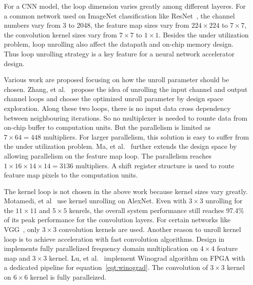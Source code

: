 
For a CNN model, the loop dimension varies greatly among different layeres. For a common network used on ImageNet classification like ResNet~\cite{he2016deep}, the channel numbers vary from 3 to 2048, the feature map sizes vary from $224\times 224$ to $7\times 7$, the convolution kernel sizes vary from $7\times 7$ to $1\times 1$. Besides the under utilization problem, loop unrolling also affect the datapath and on-chip memory design. Thus loop unrolling strategy is a key feature for a neural network accelerator design. 

Various work are proposed focusing on how the unroll parameter should be chosen. Zhang, et al.~\cite{zhang2015optimizing} propose the idea of unrolling the input channel and output channel loops and choose the optimized unroll parameter by design space exploration. Along these two loops, there is no input data cross dependency between neighbouring iterations. So no multiplexer is needed to rounte data from on-chip buffer to computation units. But the parallelism is limited as $7\times 64=448$ multipliers. For larger parallelism, this solution is easy to suffer from the under utilization problem. Ma, et al.~\cite{ma2017optimizing} further extends the design space by allowing parallelism on the feature map loop. The parallelism reaches $1\times 16\times 14\times 14=3136$ multipliers. A shift register structure is used to route feature map pixels to the computation units.

The kernel loop is not chosen in the above work because kernel sizes vary greatly. Motamedi, et al~\cite{motamedi2016design} use kernel unrolling on AlexNet. Even with $3\times 3$ unrolling for the $11\times 11$ and $5\times 5$ kenrels, the overall system performance still reaches 97.4\% of its peak performance for the convolution layers. For certain networks like VGG~\cite{simonyan2014very}, only $3\times 3$ convolution kernels are used. Another reason to unroll kernel loop is to achieve acceleration with fast convolution algorithms. Design in \cite{zhang2017frequency} implements fully parallelized frequency domain multiplication on $4\times 4$ feature map and $3\times 3$ kernel. Lu, et al.~\cite{lu2017evaluating} implement Winograd algorithm on FPGA with a dedicated pipeline for equation~\ref{eqt:winograd}. The convolution of $3\times 3$ kernel on $6\times 6$ kernel is fully paralleized.

